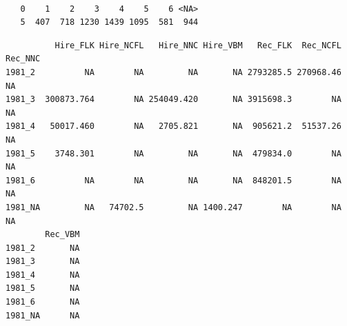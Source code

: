 \documentclass[
  letterpaper,
  oneside,
  open=any]{scrbook}
\newenvironment{Shaded}{\begin{snugshade}}{\end{snugshade}}
\newcommand{\AttributeTok}[1]{\textcolor[rgb]{0.40,0.45,0.13}{#1}}
\newcommand{\DecValTok}[1]{\textcolor[rgb]{0.68,0.00,0.00}{#1}}
\newcommand{\FunctionTok}[1]{\textcolor[rgb]{0.28,0.35,0.67}{#1}}
\newcommand{\NormalTok}[1]{\textcolor[rgb]{0.00,0.23,0.31}{#1}}
\newcommand{\OtherTok}[1]{\textcolor[rgb]{0.00,0.23,0.31}{#1}}
\newcommand{\SpecialCharTok}[1]{\textcolor[rgb]{0.37,0.37,0.37}{#1}}
\newcommand{\StringTok}[1]{\textcolor[rgb]{0.13,0.47,0.30}{#1}}
\begin{document}
\begin{verbatim}

   0    1    2    3    4    5    6 <NA> 
   5  407  718 1230 1439 1095  581  944 
\end{verbatim}

\begin{Shaded}
\end{Shaded}

\begin{verbatim}
          Hire_FLK Hire_NCFL   Hire_NNC Hire_VBM   Rec_FLK  Rec_NCFL Rec_NNC
1981_2          NA        NA         NA       NA 2793285.5 270968.46      NA
1981_3  300873.764        NA 254049.420       NA 3915698.3        NA      NA
1981_4   50017.460        NA   2705.821       NA  905621.2  51537.26      NA
1981_5    3748.301        NA         NA       NA  479834.0        NA      NA
1981_6          NA        NA         NA       NA  848201.5        NA      NA
1981_NA         NA   74702.5         NA 1400.247        NA        NA      NA
        Rec_VBM
1981_2       NA
1981_3       NA
1981_4       NA
1981_5       NA
1981_6       NA
1981_NA      NA
\end{verbatim}
\end{document}
